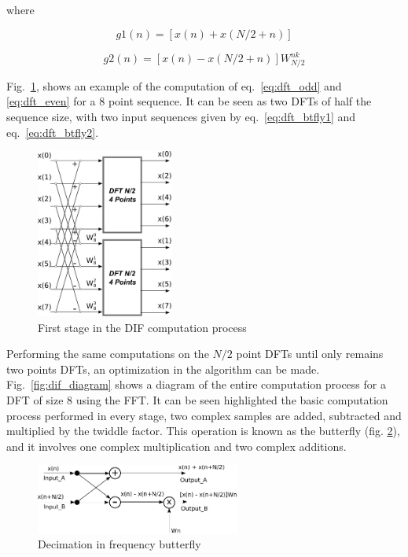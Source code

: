where 

\begin{equation} 
  g1(n) = [x(n) + x(N/2 + n)]
\label{eq:dft_btfly1}
\end{equation}

\begin{equation} 
    g2(n) = [x(n) - x(N/2 + n)]W^{nk}_{N/2}
\label{eq:dft_btfly2}
\end{equation}

Fig.~\ref{fig:dif_1}, shows an example of the computation of eq.~\ref{eq:dft_odd} and \ref{eq:dft_even} for a 8 point sequence. It can be seen as two DFTs of half the sequence size, with two input sequences given by eq.~\ref{eq:dft_btfly1} and eq.~\ref{eq:dft_btfly2}.

\begin{figure}[htbp]
  \centering
   \includegraphics[width=0.4\textwidth]{./figures/fft_partial_dif}
  \caption{First stage in the DIF computation process}
  \label{fig:dif_1}
\end{figure}

Performing the same computations on the $N/2$ point DFTs until only remains two points DFTs, an optimization in the algorithm can be made. Fig.~\ref{fig:dif_diagram} shows a diagram of the entire computation process for a DFT of size 8 using the FFT. It can be seen highlighted the basic computation process performed in every stage, two complex samples are added, subtracted and multiplied by the twiddle factor. This operation is known as the butterfly (fig. \ref{fig:DIF_btfly}), and it involves one complex multiplication and two complex additions.    

\begin{figure}[htbp]
  \centering
   \includegraphics[width=0.6\textwidth]{./figures/btfly}
  \caption{Decimation in frequency butterfly}
  \label{fig:DIF_btfly}
\end{figure}

